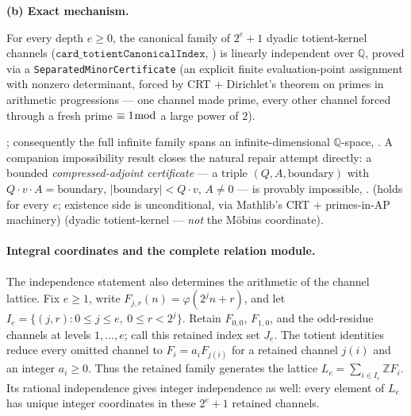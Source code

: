 \textbf{(b) Exact mechanism.}
\begin{thm}
For every depth \(e\ge0\), the canonical family of \(2^e+1\) dyadic
totient-kernel channels (\(\mathtt{card\_totientCanonicalIndex}\),
) is linearly independent over
\(\mathbb Q\), proved via a \texttt{SeparatedMinorCertificate} (an explicit
finite evaluation-point assignment with nonzero determinant, forced by CRT +
Dirichlet's theorem on primes in arithmetic progressions — one channel made
prime, every other channel forced through a fresh prime \(\equiv1\bmod\) a
large power of \(2\)).
\end{thm}
; consequently the full
infinite family spans an infinite-dimensional \(\mathbb Q\)-space,
. A companion
impossibility result closes the natural repair attempt directly: a bounded
\emph{compressed-adjoint certificate} — a triple \((Q,A,\mathrm{boundary})\)
with \(Q\cdot v\cdot A=\mathrm{boundary}\), \(|\mathrm{boundary}|<Q\cdot v\),
\(A\ne0\) — is provably impossible,
. 
 (holds for every \(e\); existence side is unconditional, via
Mathlib's CRT + primes-in-AP machinery)  (dyadic
totient-kernel — \emph{not} the Möbius coordinate).

\paragraph{Integral coordinates and the complete relation module.}
The independence statement also determines the arithmetic of the channel
lattice.  Fix $e\ge1$, write $F_{j,r}(n)=\varphi(2^j n+r)$, and let
$I_e=\{(j,r):0\le j\le e,\ 0\le r<2^j\}$.  Retain $F_{0,0}$,
$F_{1,0}$, and the odd-residue channels at levels $1,\ldots,e$; call
this retained index set $J_e$.  The totient identities reduce every omitted
channel to $F_i=a_iF_{j(i)}$ for a retained channel $j(i)$ and an integer
$a_i\ge0$.  Thus the retained family generates the lattice
$L_e=\sum_{i\in I_e}\mathbb Z F_i$.  Its rational independence gives
integer independence as well: every element of $L_e$ has unique integer
coordinates in these $2^e+1$ retained channels.

